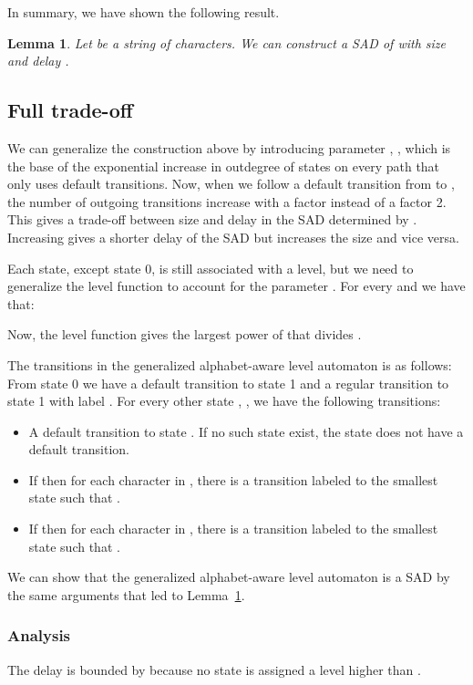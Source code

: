 \documentclass[a4paper,11pt]{article}
\newtheorem{lemma}{Lemma}
\begin{document}
In summary, we have shown the following result.
\begin{lemma}\label{lemma:alphalevel}
  Let  be a string of  characters. We can construct a SAD of  with size  and delay .
\end{lemma}




\subsection{Full trade-off}
We can generalize the construction above by introducing parameter , , which is the base of the exponential increase in outdegree of states on every path that only uses default transitions. Now, when we follow a default transition from  to , the number of outgoing transitions increase with a factor  instead of a factor 2.
This gives a trade-off between size and delay in the SAD determined by . Increasing  gives a shorter delay of the SAD but increases the size and vice versa.

Each state, except state 0, is still associated with a level, but we need to generalize the level function to account for the parameter .
For every  and  we have that:


Now, the level function gives the largest power of  that divides . 










The transitions in the generalized alphabet-aware level automaton is as follows:
From state 0 we have a default transition to state 1 and a regular transition to state 1 with label .
For every other state , , we have the following transitions:
\begin{itemize}
\item A default transition to state . If no such state exist, the state  does not have a default transition.
\item If  then for each character  in , there is a transition labeled  to the smallest state  such that .
\item If  then for each character  in , there is a transition labeled  to the smallest state  such that .
\end{itemize}

We can show that the generalized alphabet-aware level automaton is a SAD by the same arguments that led to Lemma~\ref{lemma:alphalevel}.
\subsubsection{Analysis}
The delay is bounded by  because no state is assigned a level higher than .
\end{document}
